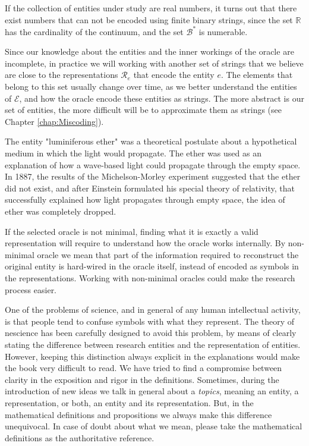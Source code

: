 \begin{example}
If the collection of entities under study are real numbers, it turns out that there exist numbers that can not be encoded using finite binary strings, since the set $\mathbb{R}$ has the cardinality of the continuum, and the set $\mathcal{B}^\ast$ is numerable.
\end{example}

Since our knowledge about the entities and the inner workings of the oracle are incomplete, in practice we will working with another set of strings that we believe are close to the representations $\mathcal{R}_e$ that encode the entity $e$. The elements that belong to this set usually change over time, as we better understand the entities of $\mathcal{E}$, and how the oracle encode these entities as strings. The more abstract is our set of entities, the more difficult will be to approximate them as strings (see Chapter \ref{chap:Miscoding}).

\begin{example}
\label{ex:luminiferous_ether}
The entity "luminiferous ether" was a theoretical postulate about a hypothetical medium in which the light would propagate. The ether was used as an explanation of how a wave-based light could propagate through the empty space. In 1887, the results of the Michelson-Morley experiment suggested that the ether did not exist, and after Einstein formulated his special theory of relativity, that successfully explained how light propagates through empty space, the idea of ether was completely dropped.
\end{example}

If the selected oracle is not minimal, finding what it is exactly a valid representation will require to understand how the oracle works internally. By non-minimal oracle we mean that part of the information required to reconstruct the original entity is hard-wired in the oracle itself, instead of encoded as symbols in the representations. Working with non-minimal oracles could make the research process easier.

\begin{remark}
One of the problems of science, and in general of any human intellectual activity, is that people tend to confuse symbols with what they represent. The theory of nescience has been carefully designed to avoid this problem, by means of clearly stating the difference between research entities and the representation of entities. However, keeping this distinction always explicit in the explanations would make the book very difficult to read. We have tried to find a compromise between clarity in the exposition and rigor in the definitions. Sometimes, during the introduction of new ideas we talk in general about a \emph{topics}, meaning an entity, a representation, or both, an entity and its representation. But, in the mathematical definitions and propositions we always make this difference unequivocal. In case of doubt about what we mean, please take the mathematical definitions as the authoritative reference. 
\end{remark}

